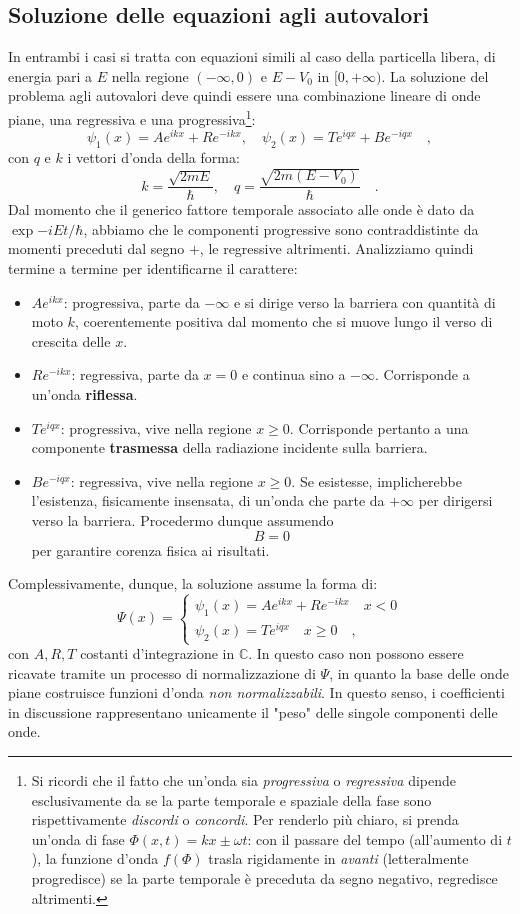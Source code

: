 \subsection{Soluzione delle equazioni agli autovalori}
In entrambi i casi si tratta con equazioni simili al caso della particella libera, di energia pari a $E$ nella regione $(-\infty, 0)$ e $E-V_0$ in $[0,+\infty)$. La soluzione del problema agli autovalori deve quindi essere una combinazione lineare di onde piane, una regressiva e una progressiva\footnote{Si ricordi che il fatto che un'onda sia \emph{progressiva} o \emph{regressiva} dipende esclusivamente da se la parte temporale e spaziale della fase sono rispettivamente \emph{discordi} o \emph{concordi}. Per renderlo più chiaro, si prenda un'onda di fase $\Phi(x,t) = kx \pm \omega t$: con il passare del tempo (all'aumento di $t$), la funzione d'onda $f(\Phi)$ trasla rigidamente in \emph{avanti} (letteralmente progredisce) se la parte temporale è preceduta da segno negativo, regredisce altrimenti.}:
\[
    \psi_1(x) = Ae^{ikx} + Re^{-ikx}, \quad \psi_2(x) = Te^{iqx} + Be^{-iqx} \quad,
\]
con $q$ e $k$ i vettori d'onda della forma:
\[
    k = \frac{\sqrt{2mE}}{\hbar}, \quad q = \frac{\sqrt{2m(E-V_0)}}{\hbar} \quad.
\]  
Dal momento che il generico fattore temporale associato alle onde è dato da $\exp{-iE t/\hbar}$, abbiamo che le componenti progressive sono contraddistinte da momenti preceduti dal segno $+$, le regressive altrimenti. Analizziamo quindi termine a termine per identificarne il carattere: 
\begin{itemize}
    \item $Ae^{ikx}$: progressiva, parte da $-\infty$ e si dirige verso la barriera con quantità di moto $k$, coerentemente positiva dal momento che si muove lungo il verso di crescita delle $x$.
    \item $Re^{-ikx}$: regressiva, parte da $x = 0$ e continua sino a $-\infty$. Corrisponde a un'onda \textbf{riflessa}.
    \item $Te^{iqx}$: progressiva, vive nella regione $x \geq 0$. Corrisponde pertanto a una componente \textbf{trasmessa} della radiazione incidente sulla barriera.
    \item $Be^{-iqx}$: regressiva, vive nella regione $x \geq 0$. Se esistesse, implicherebbe l'esistenza, fisicamente insensata, di un'onda che parte da $+\infty$ per dirigersi verso la barriera. Procedermo dunque assumendo 
    \[
    B = 0 
    \]
    per garantire corenza fisica ai risultati.
\end{itemize}
Complessivamente, dunque, la soluzione assume la forma di:
\[
    \Psi(x) = \begin{cases}
    \psi_1(x) = Ae^{ikx} + Re^{-ikx} \quad x < 0 \\
    \psi_2(x) = Te^{iqx} \quad x \geq 0 \quad,
    \end{cases}
\]
con $A, R, T$ costanti d'integrazione in $\mathbb{C}$. In questo caso non possono essere ricavate tramite un processo di normalizzazione di $\Psi$, in quanto la base delle {onde piane} costruisce funzioni d'onda \emph{non normalizzabili}. In questo senso, i coefficienti in discussione rappresentano unicamente il "peso" delle singole componenti delle onde. 

